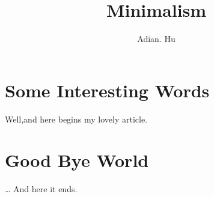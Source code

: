 \documentclass[a4paper,11pt,twoside]{article}
\author{Adian. Hu}
\title{Minimalism}
\begin{document}
\maketitle
\section{Some Interesting Words}
Well,and here begins my lovely article.
\section{Good Bye World}
\ldots{} And here it ends.
\end{document}
